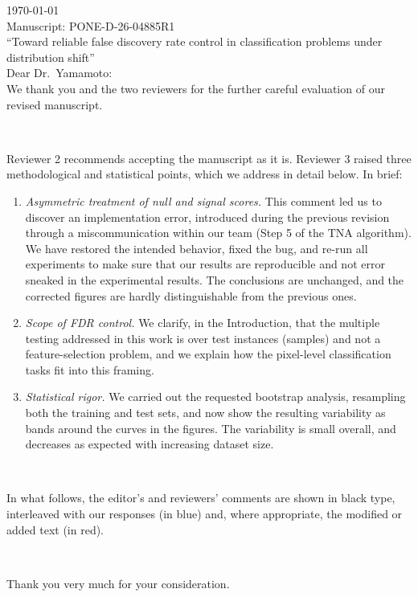 \documentclass{article}
\begin{document}
\noindent
\today\\[2ex]

\noindent
Manuscript: PONE-D-26-04885R1\\
``Toward reliable false discovery rate control in classification problems under distribution shift''\\[2ex]

\noindent
Dear Dr.\ Yamamoto:\\[2ex]

We thank you and the two reviewers for the further careful evaluation of our revised manuscript.

\

Reviewer 2 recommends accepting the manuscript as it is. Reviewer 3 raised three methodological and statistical points, which we address in detail below. In brief:

\begin{enumerate}
\item {\em Asymmetric treatment of null and signal scores.} This comment led us to discover an implementation error, introduced during the previous revision through a miscommunication within our team (Step 5 of the TNA algorithm). We have restored the intended behavior, fixed the bug, and re-run all experiments to make sure that our results are reproducible and not error sneaked in the experimental results. The conclusions are unchanged, and the corrected figures are hardly distinguishable from the previous ones.
\item {\em Scope of FDR control.} We clarify, in the Introduction, that the multiple testing addressed in this work is over test instances (samples) and not a feature-selection problem, and we explain how the pixel-level classification tasks fit into this framing.
\item {\em Statistical rigor.} We carried out the requested bootstrap analysis, resampling both the training and test sets, and now show the resulting variability as bands around the curves in the figures. The variability is small overall, and decreases as expected with increasing dataset size.
\end{enumerate}

\

In what follows, the editor's and reviewers' comments are shown in black type, interleaved with our responses (in blue) and, where appropriate, the modified or added text (in red).

\

Thank you very much for your consideration.\\[2ex]
\end{document}
